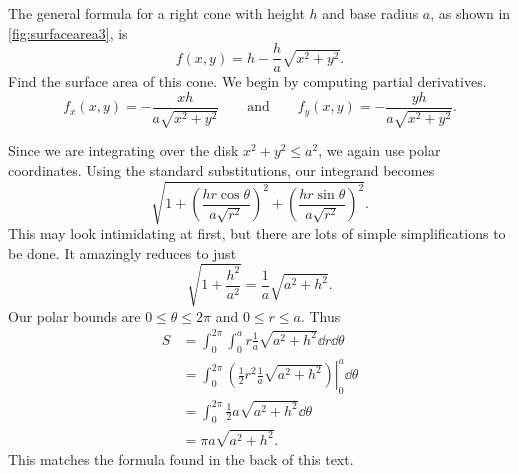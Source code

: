 \begin{example}\label{ex_surfacearea3}
The general formula for a right cone with height $h$ and base radius $a$, as shown in \autoref{fig:surfacearea3}, is
%
%
\[f(x,y) = h-\frac{h}a\sqrt{x^2+y^2}.\]
Find the surface area of this cone.
\solution
We begin by computing partial derivatives. 
\[
f_x(x,y) = -\frac{xh}{a\sqrt{x^2+y^2}}
\qquad\text{and}\qquad
f_y(x,y) = -\frac{yh}{a\sqrt{x^2+y^2}}.
\]

Since we are integrating over the disk $x^2+y^2\le a^2$, we again use polar coordinates. Using the standard substitutions, our integrand becomes
\[\sqrt{1+ \left(\frac{hr\cos\theta}{a\sqrt{r^2}}\right)^2 + \left(\frac{hr\sin\theta}{a\sqrt{r^2}}\right)^2}.\]
This may look intimidating at first, but there are lots of simple simplifications to be done. It amazingly reduces to just
\[\sqrt{1+\frac{h^2}{a^2}} = \frac1a\sqrt{a^2+h^2}.\]
Our polar bounds are $0\leq\theta\leq2\pi$ and $0\leq r\leq a$. Thus
\begin{align*}
S &=	\int_0^{2\pi}\int_0^ar\frac1a\sqrt{a^2+h^2}\dd r\dd\theta\\
	&= \int_0^{2\pi} \left.\left(\frac12r^2\frac1a\sqrt{a^2+h^2}\right)\right|_0^a\dd\theta \\
	&=	\int_0^{2\pi} \frac12a\sqrt{a^2+h^2} \dd\theta\\
	&= \pi a\sqrt{a^2+h^2}.
\end{align*}
This matches the formula found in the back of this text.
\end{example}

